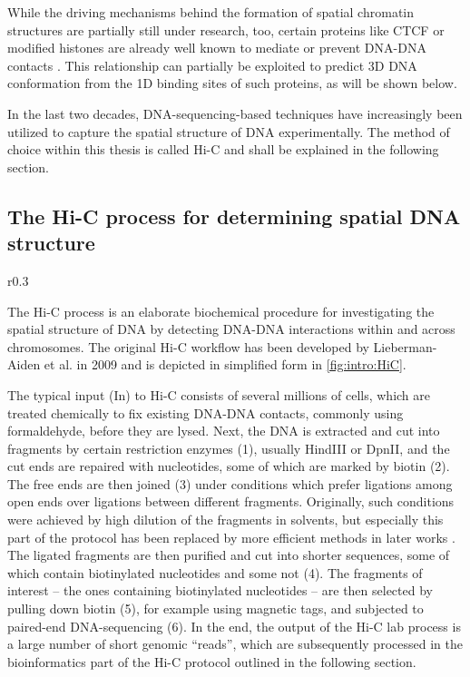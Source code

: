 While the driving mechanisms behind the formation of spatial chromatin structures are partially still under research, too,
certain proteins like CTCF or modified histones are already well known to mediate or prevent DNA-DNA contacts \cite{Phillips2009,PhillipsCremins2013,Dixon2015}.
This relationship can partially be exploited to predict 3D DNA conformation from the 1D binding sites of such proteins, as will be shown below.

In the last two decades, DNA-sequencing-based techniques have increasingly been utilized to capture the spatial structure of DNA experimentally.
The method of choice within this thesis is called Hi-C and shall be explained in the following section.

\subsection{The Hi-C process for determining spatial DNA structure} \label{sec:intro:hic}
\begin{wrapfigure}[34]{r}{0.3\textwidth}
 \vspace{-7mm}
 \caption{Hi-C lab process}
 \label{fig:intro:HiC}
\end{wrapfigure}
The Hi-C process is an elaborate biochemical procedure for investigating the 
spatial structure of DNA by detecting DNA-DNA interactions within and 
across chromosomes.
The original Hi-C workflow has been developed by Lieberman-Aiden et al. in 2009  \cite{LiebermanAiden2009}
and is depicted in simplified form in \cref{fig:intro:HiC}.

The typical input (In) to Hi-C consists of several millions of cells,
which are treated chemically to fix existing DNA-DNA contacts, 
commonly using formaldehyde, before they are lysed.
Next, the DNA is extracted and cut into fragments by certain restriction enzymes (1),
usually HindIII or DpnII, 
and the cut ends are repaired with nucleotides, some of which are marked by biotin (2).
The free ends are then joined (3) under conditions which prefer
ligations among open ends over ligations between different fragments.
Originally, such conditions were achieved by high dilution of the fragments in
solvents, but especially this part of the protocol has been replaced by 
more efficient methods in later works \cite{Rao2014,Belaghzal2017}.
The ligated fragments are then purified and cut into shorter sequences,
some of which contain biotinylated nucleotides and some not (4).
The fragments of interest -- the ones containing biotinylated nucleotides -- 
are then selected by pulling down biotin (5), for example using magnetic tags,  
and subjected to paired-end DNA-sequencing (6).
In the end, the output of the Hi-C lab process is a large number of short genomic ``reads'',
which are subsequently processed in the bioinformatics part of the Hi-C protocol 
outlined in the following section.

